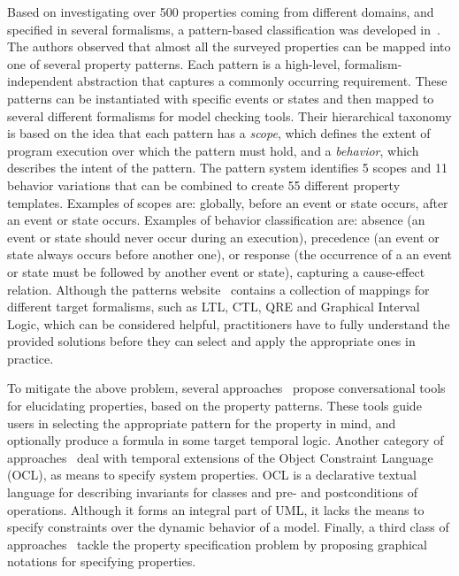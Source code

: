 \documentclass[letter]{llncs}
\begin{document}
Based on investigating over 500 properties coming from different domains, and specified in several formalisms, a pattern-based classification
was developed in~\cite{Dwyer:1999:PPS:302405.302672}. The authors observed that almost all the surveyed properties
can be mapped into one of several property patterns. Each pattern is a
high-level, formalism-independent abstraction that captures a
commonly occurring requirement. These patterns can be instantiated with specific
events or states and then mapped to several different formalisms for model
checking tools. Their hierarchical taxonomy is based on the idea that each
pattern has a \emph{scope}, which defines the extent of program execution over
which the pattern must hold, and a \emph{behavior}, which describes the intent of the pattern. The pattern
system identifies 5 scopes and 11 behavior variations that can be
combined to create 55 different property templates. Examples of scopes are: globally,
before an event or state occurs, after an event or state occurs.
Examples of behavior classification are: absence (an event or state should never
occur during an execution), precedence (an event or
state always occurs before another one), 
or response (the occurrence of a an event or state must be followed by
another event or state), capturing a cause-effect relation.
Although the patterns website~\cite{PSP} contains a collection of mappings for
different target formalisms, such as LTL, CTL, QRE and Graphical Interval Logic, which can be considered helpful,
practitioners have to fully understand the provided solutions before they can
select and apply the appropriate ones in practice.

To mitigate the above problem, several approaches~\cite{Smith02propel:an,konrad2005facilitating,Mondragon_prospec} propose conversational tools for
elucidating properties, based on the property patterns. These tools guide users in selecting the appropriate pattern
for the property in mind, and optionally produce a formula in some target temporal logic. 
Another category of approaches~\cite{Ziemann02anextension,Flake03formalsemantics,Ackermann:2006:LOS:2135315.2135339} deal with temporal extensions 
of the Object Constraint Language (OCL), as means to specify system
properties. OCL is a declarative textual language for describing invariants for
classes and pre- and postconditions of operations. Although it forms an integral
part of UML, it lacks the means to specify constraints over the dynamic behavior
of a model. Finally, a third class of approaches~\cite{Autili:2007:GSS:1290845.1290859,Lee97agraphical,Smith:2001:ECG:882477.883639,Knapp:2006:MCU:1762828.1762836,Lilius99vuml:a,Kugler:2005:TLS:2140653.2140692,MVPSA} tackle the property
specification problem by proposing graphical notations for specifying properties.
\end{document}
